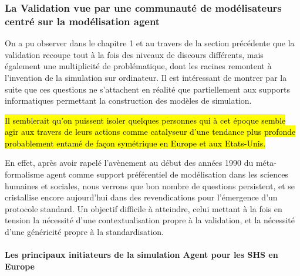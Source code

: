 
\subsubsection{La Validation vue par une communauté de modélisateurs centré sur la modélisation agent}
\label{sssec:communautes_jasss}

On a pu observer dans le chapitre 1 et au travers de la section précédente que la validation recoupe tout à la fois des niveaux de discours différents, mais également une multiplicité de problématique, dont les racines remontent à l'invention de la simulation sur ordinateur. Il est intéressant de montrer par la suite que ces questions ne s'attachent en réalité que partiellement aux supports informatiques permettant la construction des modèles de simulation. 



\hl{Il semblerait qu'on puissent isoler quelques personnes qui à cet époque semble agir aux travers de leurs actions comme catalyseur d'une tendance plus profonde probablement entamé de façon symétrique en Europe et aux Etats-Unis.}


En effet, après avoir rapelé l’avènement au début des années 1990 du méta-formalisme agent comme support préférentiel de modélisation dans les sciences humaines et sociales, nous verrons que bon nombre de questions persistent, et se cristallise encore aujourd'hui dans des revendications pour l'émergence d'un protocole standard. Un objectif difficile à atteindre, celui mettant à la fois en tension la nécessité d'une contextualisation propre à la validation, et la nécessité d'une généricité propre à la standardisation.


\paragraph{Les principaux initiateurs de la simulation Agent pour les SHS en Europe}
\label{p:communautes_europe}



